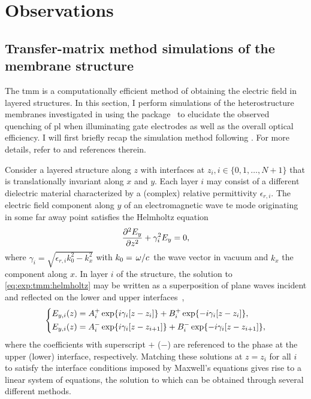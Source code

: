 \chapter{Observations}\label{ch:exp:observations}
\section{Transfer-matrix method simulations of the membrane structure}\label{sec:exp:tmm}
The \gls{tmm} is a computationally efficient method of obtaining the electric field in layered structures.
In this section, I perform simulations of the heterostructure membranes investigated in \thispart using the \pymoosh package~\cite{Langevin2024} to elucidate the observed quenching of \gls{pl} when illuminating gate electrodes as well as the overall optical efficiency.
I will first briefly recap the simulation method following .
For more details, refer to \ibid and references therein.

Consider a layered structure along $z$ with interfaces at $z_i, i\in\lbrace 0, 1, \dotsc, N+1\rbrace$ that is translationally invariant along $x$ and $y$.
Each layer $i$ may consist of a different dielectric material characterized by a (complex) relative permittivity $\epsilon_{r,i}$.
The electric field component along $y$ of an electromagnetic wave \gls{te} mode originating in some far away point satisfies the Helmholtz equation
\begin{equation}\label{eq:exp:tmm:helmholtz}
    \pdv[2]{E_y}{z} + \gamma_i^2 E_y = 0,
\end{equation}
where $\gamma_i = \sqrt{\epsilon_{r,i}k_0^2 - k_x^2}$ with $k_0=\flatfrac{\omega}{c}$ the wave vector in vacuum and $k_x$ the component along $x$.
In layer $i$ of the structure, the solution to \cref{eq:exp:tmm:helmholtz} may be written as a superposition of plane waves incident and reflected on the lower and upper interfaces~\cite{Langevin2024},
\begin{equation}\label{eq:exp:tmm:fields}
    \begin{dcases}
        E_{y,i}(z) = A_i^{+}\exp{\ensuremath{i}\gamma_i[z-z_{i}]} + B_i^{+}\exp{-\ensuremath{i}\gamma_i[z-z_{i}]}, \\
        E_{y,i}(z) = A_i^{-}\exp{\ensuremath{i}\gamma_i[z-z_{i+1}]} + B_i^{-}\exp{-\ensuremath{i}\gamma_i[z-z_{i+1}]},
    \end{dcases}
\end{equation}
where the coefficients with superscript $+$ ($-$) are referenced to the phase at the upper (lower) interface, respectively.
Matching these solutions at $z=z_i$ for all $i$ to satisfy the interface conditions imposed by Maxwell's equations gives rise to a linear system of equations, the solution to which can be obtained through several different methods.


